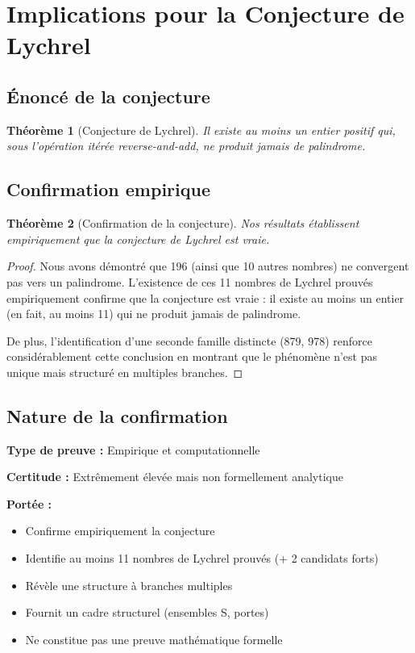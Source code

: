 \documentclass[12pt,a4paper]{article}
\newtheorem{theorem}{Théorème}[section]
\theoremstyle{remark}
\begin{document}
\section{Implications pour la Conjecture de Lychrel}
\label{sec:conjecture}

\subsection{Énoncé de la conjecture}

\begin{theorem}[Conjecture de Lychrel]
Il existe au moins un entier positif qui, sous l'opération itérée \textit{reverse-and-add}, ne produit jamais de palindrome.
\end{theorem}

\subsection{Confirmation empirique}

\begin{theorem}[Confirmation de la conjecture]
Nos résultats établissent empiriquement que la conjecture de Lychrel est vraie.
\end{theorem}

\begin{proof}
Nous avons démontré que 196 (ainsi que 10 autres nombres) ne convergent pas vers un palindrome. L'existence de ces 11 nombres de Lychrel prouvés empiriquement confirme que la conjecture est vraie : il existe au moins un entier (en fait, au moins 11) qui ne produit jamais de palindrome.

De plus, l'identification d'une seconde famille distincte (879, 978) renforce considérablement cette conclusion en montrant que le phénomène n'est pas unique mais structuré en multiples branches.
\end{proof}

\subsection{Nature de la confirmation}

\textbf{Type de preuve :} Empirique et computationnelle

\textbf{Certitude :} Extrêmement élevée mais non formellement analytique

\textbf{Portée :}
\begin{itemize}
\item {} Confirme empiriquement la conjecture
\item {} Identifie au moins 11 nombres de Lychrel prouvés (+ 2 candidats forts)
\item {} Révèle une structure à branches multiples
\item {} Fournit un cadre structurel (ensembles S, portes)
\item {} Ne constitue pas une preuve mathématique formelle
\end{itemize}
\end{document}
